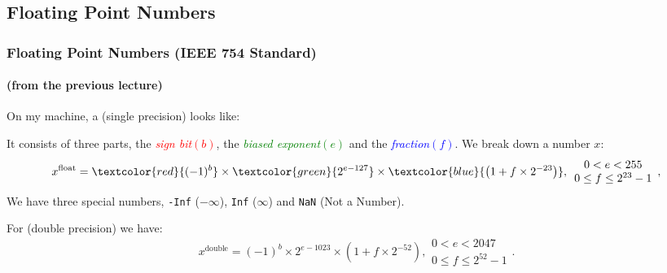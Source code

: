 \documentclass[smaller,handout,table]{beamer}
\begin{document}
\subsection{Floating Point Numbers}
\begin{frame}
\frametitle{Floating Point Numbers (IEEE 754 Standard)}
\framesubtitle{(from the previous lecture)}
On my machine, a  (single precision) looks like:\\
\begin{center}
\end{center}
It consists of three parts, the \textcolor{red}{\emph{sign bit}$(b)$}, the \textcolor{green}{\emph{biased exponent}$(e)$} and the \textcolor{blue}{\emph{fraction}$(f)$}.
We break down a number $x$:
$$x^{\textrm{float}} = \textcolor{red}{(-1)^b} \times 
\textcolor{green}{2^{e-127}} \times \textcolor{blue}{\left(1+f\times2^{-23}\right)},
\begin{array}{c}
0 < e < 255\\0 \leq f \leq 2^{23}-1
\end{array},$$
We have three special numbers, {\tt -Inf} ($-\infty$), {\tt Inf} ($\infty$) and {\tt NaN} (Not a Number).

For  (double precision) we have:
$$x^{\textrm{double}} = (-1)^b\times 2^{e-1023}\times\left(1+f\times2^{-52}\right),
\begin{array}{c}
0 < e < 2047\\0 \leq f \leq 2^{52}-1
\end{array}.$$
\end{frame}
\end{document}
